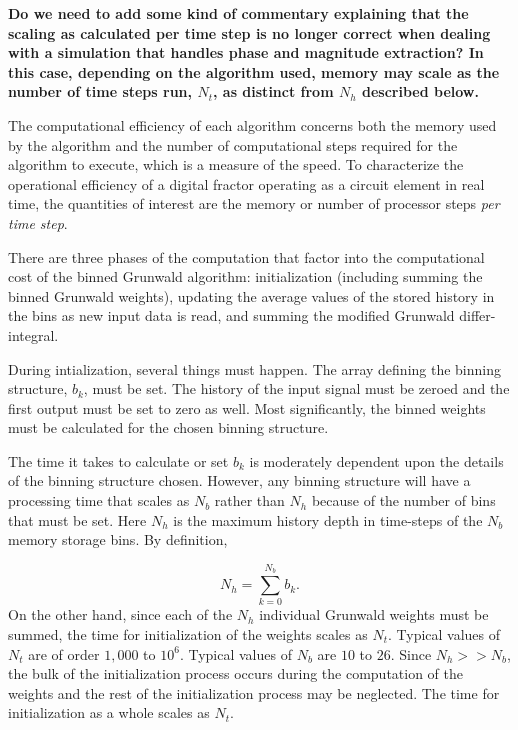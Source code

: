 {\bf Do we need to add some kind of commentary explaining that the scaling as calculated per time step is no longer correct when dealing with a simulation that handles phase and magnitude extraction? In this case, depending on the algorithm used, memory may scale as the number of time steps run, $N_t$, as distinct from $N_h$ described below.}

The computational efficiency of each algorithm concerns both the
memory used by the algorithm and the number of computational steps
required for the algorithm to execute, which is a measure of the
speed. To characterize the operational efficiency of a digital fractor
operating as a circuit element in real time, the quantities of
interest are the memory or number of processor steps {\em per time
  step}.

There are three phases of the computation that factor into the
computational cost of the binned Grunwald algorithm: initialization
(including summing the binned Grunwald weights), updating the average
values of the stored history in the bins as new input data is read,
and summing the modified Grunwald differ-integral.

During intialization, several things must happen. The array defining
the binning structure, $b_k$, must be set. The history of the input
signal must be zeroed and the first output must be set to zero as
well. Most significantly, the binned weights must be calculated for
the chosen binning structure.

The time it takes to calculate or set $b_k$ is moderately dependent
upon the details of the binning structure chosen. However, any binning
structure will have a processing time that scales as $N_b$ rather than
$N_h$ because of the number of bins that must be set. Here $N_h$ is
the maximum history depth in time-steps of the $N_b$ memory storage
bins. By definition,

\begin{equation}
N_h = \displaystyle\sum_{k=0}^{N_b}b_k.
\label{eqn:Nh}
\end{equation}
On the other hand, since each of the $N_h$ individual Grunwald weights
must be summed, the time for initialization of the weights scales as
$N_t$. Typical values of $N_t$ are of order $1,000$ to $10^6$. Typical
values of $N_b$ are $10$ to $26$. Since $N_h>>N_b$, the bulk of the
initialization process occurs during the computation of the weights
and the rest of the initialization process may be neglected. The time
for initialization as a whole scales as $N_t$.

